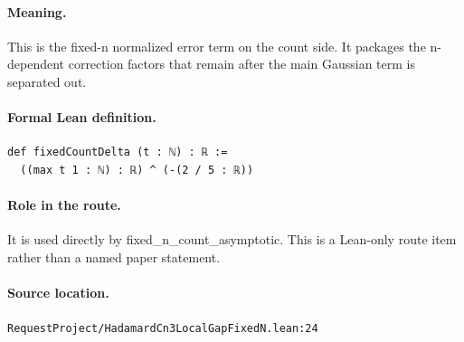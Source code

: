 \medskip
\paragraph{Meaning.}
This is the fixed-n normalized error term on the count side. It packages the n-dependent correction factors that remain after the main Gaussian term is separated out.
\paragraph{Formal Lean definition.}
\begin{verbatim}
def fixedCountDelta (t : ℕ) : ℝ :=
  ((max t 1 : ℕ) : ℝ) ^ (-(2 / 5 : ℝ))
\end{verbatim}
\paragraph{Role in the route.}
It is used directly by fixed\_n\_count\_asymptotic. This is a Lean-only route item rather than a named paper statement.
\paragraph{Source location.}
\texttt{RequestProject/HadamardCn3LocalGapFixedN.lean:24}
\medskip
